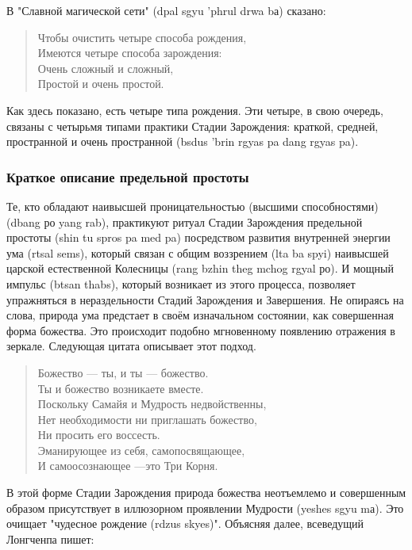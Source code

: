 В "Славной магической сети" (dpal sgyu 'phrul drwa bа) сказано:

\begin{verse}
Чтобы очистить четыре способа рождения,\\
Имеются четыре способа зарождения:\\
Очень сложный и сложный,\\
Простой и очень простой.
\end{verse}

\begin{siderules}
Как здесь показано, есть четыре типа рождения. Эти четыре, в свою очередь, связаны с
четырьмя типами практики Стадии Зарождения: краткой, средней, пространной и очень
пространной (bsdus 'brin rgyas pa dang rgyas pa).
\end{siderules}

\subsubsection{Краткое описание предельной простоты}
\vspace{1cm}
Те, кто обладают наивысшей проницательностью (высшими способностями) (dbang ро
yang rab), практикуют ритуал Стадии Зарождения предельной простоты (shin tu spros pa med
pa) посредством развития внутренней энергии ума (rtsal sems), который связан с общим
воззрением (lta ba spyi) наивысшей царской естественной Колесницы (rang bzhin theg mchog
rgyal ро). И мощный импульс (btsan thabs), который возникает из этого процесса, позволяет
упражняться в нераздельности Стадий Зарождения и Завершения. Не опираясь на слова,
природа ума предстает в своём изначальном состоянии, как совершенная форма божества.
Это происходит подобно мгновенному появлению отражения в зеркале. Следующая цитата
описывает этот подход.

\begin{verse}
Божество — ты, и ты — божество.\\
Ты и божество возникаете вместе.\\
Поскольку Самайя и Мудрость недвойственны,\\
Нет необходимости ни приглашать божество,\\
Ни просить его воссесть.\\
Эманирующее из себя, самопосвящающее,\\
И самоосознающее —это Три Корня.\\
\end{verse}

В этой форме Стадии Зарождения природа божества неотъемлемо и совершенным
образом присутствует в иллюзорном проявлении Мудрости (yeshes sgyu mа).
Это очищает "чудесное рождение (rdzus skyes)". Объясняя далее, всеведущий Лонгченпа пишет:

